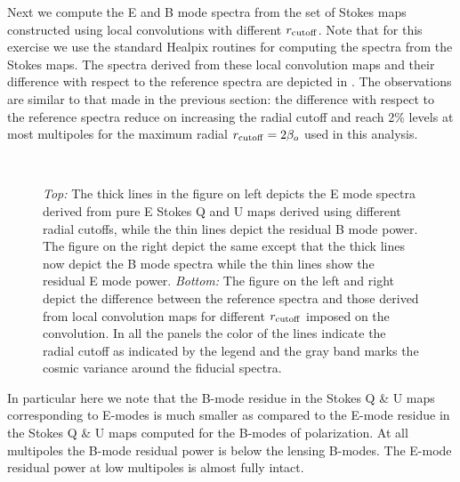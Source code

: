 Next we compute the E and B mode spectra from the set of Stokes maps constructed using local convolutions with different $r_{\rm cutoff}$. Note that for this exercise we use the standard Healpix routines for computing the spectra from the Stokes maps. The spectra derived from these local convolution maps and their difference with respect to the reference spectra are depicted in . The observations are similar to that made in the previous section: the difference with respect to the reference spectra reduce on increasing the radial cutoff and reach 2\% levels at most multipoles for the maximum radial $r_{\rm cutoff} =2 \beta_o$ used in this analysis.
%
\begin{figure}[!t] 
\centering
{}
\\[-5ex]
\caption{\textit{Top:} The thick lines in the figure on left depicts the E mode spectra derived from pure E Stokes Q and U maps derived using different radial cutoffs, while the thin lines depict the residual B mode power. The figure on the right depict the same except that the thick lines now depict the B mode spectra while the thin lines show the residual E mode power. \textit{Bottom:} The figure on the left and right depict the difference between the reference spectra and those derived from local convolution maps for different $r_{\rm cutoff}$ imposed on the convolution. In all the panels the color of the lines indicate the radial cutoff as indicated by the legend and the gray band marks the cosmic variance around the fiducial spectra.}
\label{fig:equ-bqu-spectra_rad_cutoff}
\end{figure}
%
In particular here we note that the B-mode residue in the Stokes Q \& U maps corresponding to E-modes is much smaller as compared to the E-mode residue in the Stokes Q \& U maps  computed for the B-modes of polarization. At all multipoles the B-mode residual power is below the lensing B-modes. The E-mode residual power at low multipoles is almost fully intact. 

